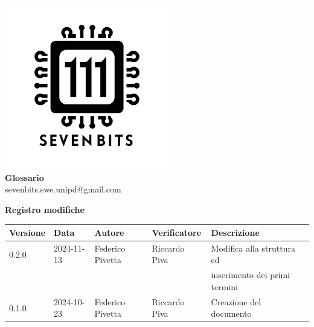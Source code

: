 \documentclass[10pt]{article}
\begin{document}
\begin{titlepage}
    \setcounter{page}{0}
    \centering
    \includegraphics[width=7.2cm]{Sevenbitslogo.png} \\[2cm] 
    
     {\fontsize{40}{40}\bfseries Glossario}\selectfont \\[3.9em]
    
    {\large sevenbits.swe.unipd@gmail.com} \\[3em]
    
    \hfill
    
        
        
    

    \vfill %
\end{titlepage}
\newpage
\clearpage
\setcounter{page}{1}


\centering\textbf{Registro modifiche}\\
\vspace{2mm}
\begin{tabular}{|l|l|l|l|l|l|}
\hline
\textbf{Versione} & \textbf{Data} & \textbf{Autore} & \textbf{Verificatore} & \textbf{Descrizione}\\
\hline
0.2.0 & 2024-11-13  & Federico Pivetta & Riccardo Piva  & Modifica alla struttura ed\\
& & & & inserimento dei primi termini\\
\hline
0.1.0 & 2024-10-23  & Federico Pivetta & Riccardo Piva  & Creazione del documento\\
\hline

\end{tabular}
\newpage
\raggedright
\tableofcontents
\newpage
\end{document}
